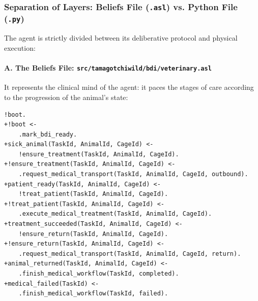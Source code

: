 \documentclass{article}
\renewcommand{\_}{\oldtextunderscore\allowbreak}
\begin{document}
\subsubsection{Separation of Layers: Beliefs File (\texttt{.asl}) vs. Python File (\texttt{.py})}
The agent is strictly divided between its deliberative protocol and physical execution:
\paragraph{A. The Beliefs File: \texttt{src/tamagotchi\_wild/bdi/veterinary.asl}}
It represents the clinical mind of the agent: it paces the stages of care according to the progression of the animal's state:
\begin{lstlisting}
!boot.
+!boot <-
    .mark_bdi_ready.
+sick_animal(TaskId, AnimalId, CageId) <-
    !ensure_treatment(TaskId, AnimalId, CageId).
+!ensure_treatment(TaskId, AnimalId, CageId) <-
    .request_medical_transport(TaskId, AnimalId, CageId, outbound).
+patient_ready(TaskId, AnimalId, CageId) <-
    !treat_patient(TaskId, AnimalId, CageId).
+!treat_patient(TaskId, AnimalId, CageId) <-
    .execute_medical_treatment(TaskId, AnimalId, CageId).
+treatment_succeeded(TaskId, AnimalId, CageId) <-
    !ensure_return(TaskId, AnimalId, CageId).
+!ensure_return(TaskId, AnimalId, CageId) <-
    .request_medical_transport(TaskId, AnimalId, CageId, return).
+animal_returned(TaskId, AnimalId, CageId) <-
    .finish_medical_workflow(TaskId, completed).
+medical_failed(TaskId) <-
    .finish_medical_workflow(TaskId, failed).
\end{lstlisting}
\end{document}
